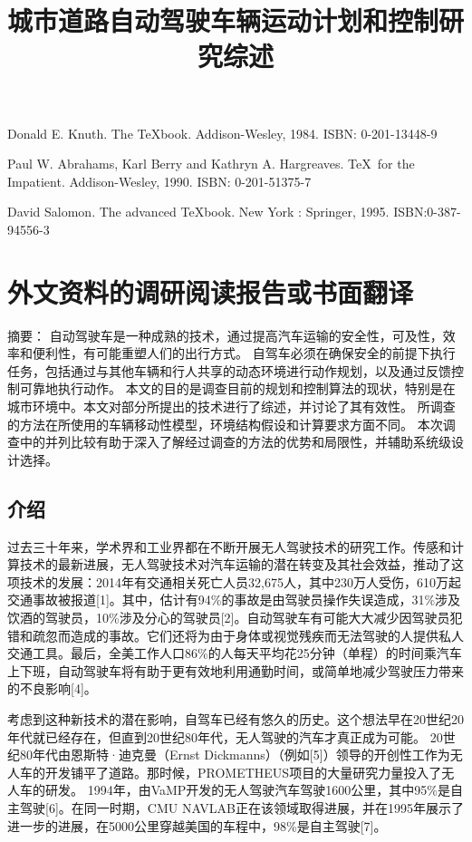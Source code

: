 \begin{translationbib}
\item Donald E. Knuth. The \TeX book. Addison-Wesley, 1984. ISBN: 0-201-13448-9
\item Paul W. Abrahams, Karl Berry and Kathryn A. Hargreaves. \TeX\ for the
  Impatient. Addison-Wesley, 1990. ISBN: 0-201-51375-7
\item David Salomon. The advanced \TeX book.  New York : Springer, 1995. ISBN:0-387-94556-3
\end{translationbib}

\chapter{外文资料的调研阅读报告或书面翻译}

\title{城市道路自动驾驶车辆运动计划和控制研究综述}

{\heiti 摘要：} 自动驾驶车是一种成熟的技术，通过提高汽车运输的安全性，可及性，效率和便利性，有可能重塑人们的出行方式。 自驾车必须在确保安全的前提下执行任务，包括通过与其他车辆和行人共享的动态环境进行动作规划，以及通过反馈控制可靠地执行动作。 本文的目的是调查目前的规划和控制算法的现状，特别是在城市环境中。本文对部分所提出的技术进行了综述，并讨论了其有效性。 所调查的方法在所使用的车辆移动性模型，环境结构假设和计算要求方面不同。 本次调查中的并列比较有助于深入了解经过调查的方法的优势和局限性，并辅助系统级设计选择。

\section{介绍}

过去三十年来，学术界和工业界都在不断开展无人驾驶技术的研究工作。传感和计算技术的最新进展，无人驾驶技术对汽车运输的潜在转变及其社会效益，推动了这项技术的发展：2014年有交通相关死亡人员32,675人，其中230万人受伤，610万起交通事故被报道[1]。其中，估计有94\%的事故是由驾驶员操作失误造成，31\%涉及饮酒的驾驶员，10\%涉及分心的驾驶员[2]。自动驾驶车有可能大大减少因驾驶员犯错和疏忽而造成的事故。它们还将为由于身体或视觉残疾而无法驾驶的人提供私人交通工具。最后，全美工作人口86\%的人每天平均花25分钟（单程）的时间乘汽车上下班，自动驾驶车将有助于更有效地利用通勤时间，或简单地减少驾驶压力带来的不良影响[4]。

考虑到这种新技术的潜在影响，自驾车已经有悠久的历史。这个想法早在20世纪20年代就已经存在，但直到20世纪80年代，无人驾驶的汽车才真正成为可能。 20世纪80年代由恩斯特·迪克曼（Ernst Dickmanns）（例如[5]）领导的开创性工作为无人车的开发铺平了道路。那时候，PROMETHEUS项目的大量研究力量投入了无人车的研发。 1994年，由VaMP开发的无人驾驶汽车驾驶1600公里，其中95\%是自主驾驶[6]。在同一时期，CMU NAVLAB正在该领域取得进展，并在1995年展示了进一步的进展，在5000公里穿越美国的车程中，98\%是自主驾驶[7]。

